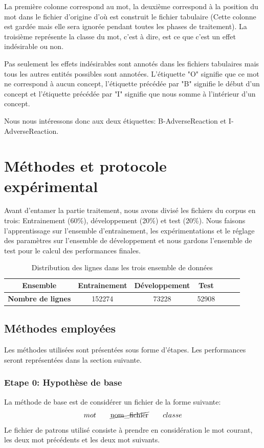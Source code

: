 \documentclass[a4paper,english,11pt]{article}
\begin{document}
\begin{itemize}
La première colonne correspond au mot, la deuxième correspond à la position du mot dans le fichier d'origine d'où est construit le fichier tabulaire (Cette colonne est gardée mais elle sera ignorée pendant toutes les phases de traitement). La troisième représente la classe du mot, c'est à dire, est ce que c'est un effet indésirable ou non.

Pas seulement les effets indésirables sont annotés dans les fichiers tabulaires mais tous les autres entités possibles sont annotées. L'étiquette "O" signifie que ce mot ne correspond à aucun concept, l'étiquette précédée par "B" signifie le début d'un concept et l'étiquette précédée par "I" signifie que nous somme à l'intérieur d'un concept. 

Nous nous intéressons donc aux deux étiquettes: B-AdverseReaction et I-AdverseReaction.
	
\end{itemize}

\section{Méthodes et protocole expérimental}
Avant d'entamer la partie traitement, nous avons divisé les fichiers du corpus en trois: Entrainement (60\%), développement (20\%) et test (20\%). Nous faisons l'apprentissage sur l'ensemble d'entrainement, les expérimentations et le réglage des paramètres sur l'ensemble de développement et nous gardons l'ensemble de test pour le calcul des performances finales.

\begin{table}[H]\centering
	\begin{tabular}{ccccccc}
		\toprule \textbf{Ensemble} & Entrainement & Développement & Test \\    \midrule
		\textbf{Nombre de lignes} & 152274 & 73228 & 52908  \\   
		\bottomrule	
	\end{tabular}
	\caption{Distribution des lignes dans les trois ensemble de données\label{}}
\end{table}

\subsection{Méthodes employées}
Les méthodes utilisées sont présentées sous forme d'étapes. Les performances seront représentées dans la section suivante.
\subsubsection{Etape 0: Hypothèse de base}
La méthode de base est de considérer un fichier de la forme suivante:
$$
mot\qquad \text{\cancel{nom\_fichier}}\qquad	classe		
$$
Le fichier de patrons utilisé consiste à prendre en considération le mot courant, les deux mot précédents et les deux mot suivants.
\end{document}
